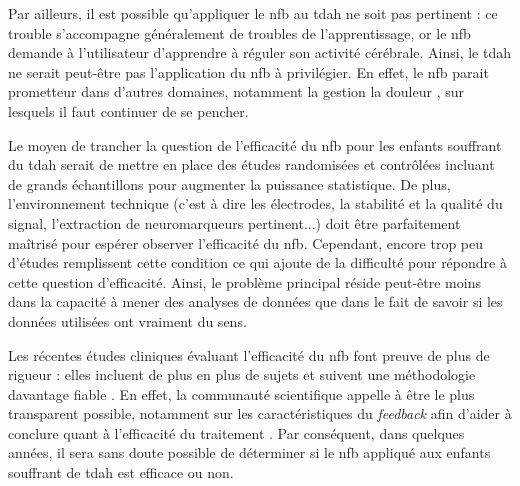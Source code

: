 Par ailleurs, il est possible qu'appliquer le \gls{nfb} au \gls{tdah} ne soit pas pertinent : ce trouble s'accompagne généralement de troubles de l'apprentissage,
or le \gls{nfb} demande à l'utilisateur d'apprendre à réguler son activité cérébrale. Ainsi, le \gls{tdah} ne serait peut-être pas l'application du 
\gls{nfb} à privilégier. En effet, le \gls{nfb} parait prometteur dans d'autres domaines, notamment la gestion la douleur \citep{Mayaud2019}, sur lesquels 
il faut continuer de se pencher.

Le moyen de trancher la question de l'efficacité du \gls{nfb} pour les enfants souffrant du \gls{tdah} serait de mettre en place des études randomisées 
et contrôlées incluant de grands échantillons pour augmenter la puissance statistique. De plus, l'environnement technique (c'est à dire 
les électrodes, la stabilité et la qualité du signal, l'extraction de neuromarqueurs pertinent...) doit être parfaitement maîtrisé pour espérer observer
l'efficacité du \gls{nfb}. Cependant, encore trop peu d'études remplissent cette condition ce qui ajoute de la difficulté pour répondre à cette question d'efficacité. 
Ainsi, le problème principal réside peut-être moins dans la capacité à mener des analyses de données que dans le fait de savoir si les données utilisées 
ont vraiment du sens.  

Les récentes études cliniques évaluant l'efficacité du \gls{nfb} 
font preuve de plus de rigueur : elles incluent de plus en plus de sujets et suivent une méthodologie davantage fiable \citep{Bioulac2019}. 
En effet, la communauté scientifique appelle à être le plus transparent possible, notamment sur les caractéristiques du \textit{feedback} afin d'aider à 
conclure quant à l'efficacité du traitement \citep{Ros2019}. Par conséquent, dans quelques années, il sera sans doute possible de déterminer si le \gls{nfb} 
appliqué aux enfants souffrant de \gls{tdah} est efficace ou non.



